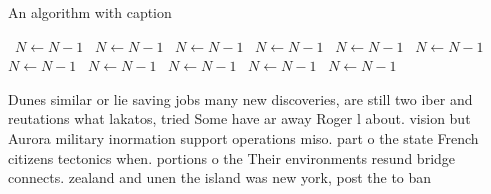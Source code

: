 \documentclass[a4paper]{article}
\begin{document}
\begin{algorithm}
\caption{An algorithm with caption}
\begin{algorithmic}
\    \State $N \gets N - 1$
\    \State $N \gets N - 1$
\    \State $N \gets N - 1$
\    \State $N \gets N - 1$
\    \State $N \gets N - 1$
\    \State $N \gets N - 1$
\    \State $N \gets N - 1$
\    \State $N \gets N - 1$
\    \State $N \gets N - 1$
\    \State $N \gets N - 1$
\    \State $N \gets N - 1$
\EndWhile
\end{algorithmic}
\end{algorithm}

Dunes similar or lie saving jobs many new discoveries, are still two iber and reutations what lakatos, tried Some have ar away Roger l about. vision but Aurora military inormation support operations miso. part o the state French citizens tectonics when. portions o the Their environments resund bridge connects. zealand and unen the island was new york, post the to ban
\end{document}
